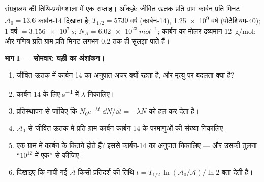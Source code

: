 \begin{problem}
\label{pb:g12:radioactive-decay:1}
संग्रहालय की तिथि-प्रयोगशाला में एक सप्ताह। आँकड़े: जीवित ऊतक प्रति ग्राम
कार्बन प्रति मिनट $\mathcal A_0 = 13.6$ कार्बन-14  दिखाता है; $T_{1/2} = \num{5730}$ वर्ष (कार्बन-14),
\num{1.25e9} वर्ष (पोटैशियम-40); $1$ वर्ष $= \qty{3.156e7}{s}$; $N_A = \qty{6.02e23}{mol^{-1}}$; कार्बन का मोलर
द्रव्यमान \qty{12}{g/mol}; और गणित्र प्रति ग्राम प्रति मिनट लगभग $0.2$  तक ही
सुलझा पाते हैं।

\medskip
\noindent\textbf{भाग I --- सोमवार: घड़ी का अंशांकन।}
\begin{enumerate}
  \item जीवित ऊतक में कार्बन-14 का अनुपात अचर क्यों रहता है, और मृत्यु पर
        बदलता क्या है?
  \item कार्बन-14 के लिए \unit{s^{-1}} में $\lambda$ निकालिए।
  \item प्रतिस्थापन से जाँचिए कि $N_0 e^{-\lambda t}$ $\dd N/\dd t = -\lambda N$ को हल कर देता है।
  \item $\mathcal A_0$ से जीवित ऊतक में प्रति ग्राम कार्बन कार्बन-14 के
        परमाणुओं की संख्या निकालिए।
  \item एक ग्राम में कार्बन के कितने  होते हैं? इससे कार्बन-14
        का अनुपात निकालिए --- और उसकी तुलना ``$10^{12}$ में एक'' से कीजिए।
  \item दिखाइए कि नापी गई  $\mathcal A$ किसी प्रतिदर्श की तिथि
        $t = T_{1/2}\,\ln(\mathcal A_0/\mathcal A)/\ln 2$ बता देती है।
\end{enumerate}


\end{problem}
